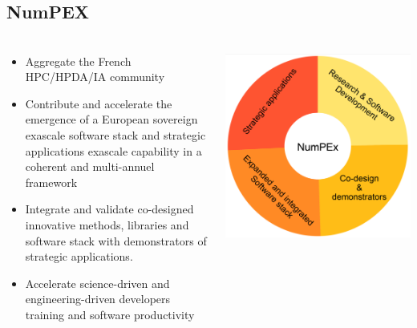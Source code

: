\subsection*{NumPEX}
\begin{frame}
  \frametitle{\insertsectionhead}
\footnotesize
  \begin{columns}
    \begin{column}{0.5\textwidth}
      \begin{itemize}
        \item \alert{Aggregate the French HPC/HPDA/IA}
        community
        \item Contribute and accelerate the emergence of a 
        \alert{European sovereign exascale software stack and strategic applications exascale capability in a coherent and multi-annuel framework}
        \item Integrate and validate \alert{co-designed} innovative methods, libraries and software stack with demonstrators of strategic applications.
        \item Accelerate science-driven and engineering-driven developers \alert{training and software  productivity}
      \end{itemize}
    \end{column}
    \begin{column}{.5\textwidth}
      \includegraphics[width=\textwidth]{../figures/numpex-objectives.png}
    \end{column}
  \end{columns}

\end{frame}

